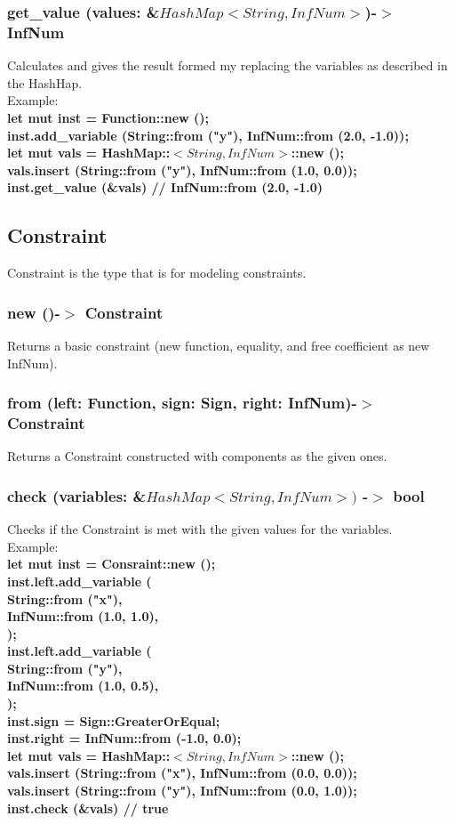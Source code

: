 \documentclass[]{article}
\begin{document}
				\subsubsection{get\_value (values: \&$HashMap<String, InfNum>$)-$>$ InfNum}
					Calculates and gives the result formed my replacing the variables as described in the HashHap.\\Example:\\
					\large{\textbf{let mut inst = Function::new ();\\
        inst.add\_variable (String::from ("y"), InfNum::from (2.0, -1.0));\\
        let mut vals = HashMap::$<String, InfNum>$::new ();\\
        vals.insert (String::from ("y"), InfNum::from (1.0, 0.0));\\
        inst.get\_value (\&vals) // InfNum::from (2.0, -1.0)}}
			\subsection{Constraint}
				\Large{Constraint is the type that is for modeling constraints.}
				\subsubsection{new ()-$>$ Constraint}
					Returns a basic constraint (new function, equality, and free coefficient as new InfNum).
				\subsubsection{from (left: Function, sign: Sign, right: InfNum)-$>$ Constraint}
					Returns a Constraint constructed with components as the given ones.
				\subsubsection{check (variables: \&$HashMap<String, InfNum>)$ -$>$ bool}
					Checks if the Constraint is met with the given values for the variables.\\Example:\\
					\large{\textbf{let mut inst = Consraint::new ();\\
        inst.left.add\_variable (\\
            String::from ("x"),\\
            InfNum::from (1.0, 1.0),\\
        );\\
        inst.left.add\_variable (\\
            String::from ("y"),\\
            InfNum::from (1.0, 0.5),\\
        );\\
        inst.sign = Sign::GreaterOrEqual;\\
        inst.right = InfNum::from (-1.0, 0.0);\\
        let mut vals = HashMap::$<String, InfNum>$::new ();\\
        vals.insert (String::from ("x"), InfNum::from (0.0, 0.0));\\
        vals.insert (String::from ("y"), InfNum::from (0.0, 1.0));\\
        inst.check (\&vals) // true}}
\end{document}
